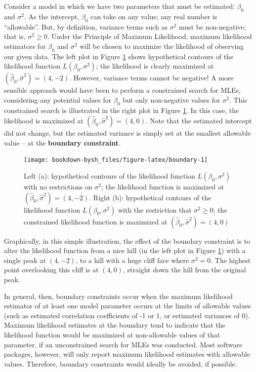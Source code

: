\documentclass[
]{krantz}
\begin{document}
Consider a model in which we have two parameters that must be estimated: \(\beta_0\) and \(\sigma^2\). As the intercept, \(\beta_0\) can take on any value; any real number is ``allowable''. But, by definition, variance terms such as \(\sigma^2\) must be non-negative; that is, \(\sigma^2 \geq 0\). Under the Principle of Maximum Likelihood, maximum likelihood estimators for \(\beta_0\) and \(\sigma^2\) will be chosen to maximize the likelihood of observing our given data. The left plot in Figure \ref{fig:boundary} shows hypothetical contours of the likelihood function \(L(\beta_0, \sigma^2)\); the likelihood is clearly maximized at \((\hat{\beta}_0 , \hat{\sigma}^2)=(4,-2)\). However, variance terms cannot be negative! A more sensible approach would have been to perform a constrained search for MLEs, considering any potential values for \(\beta_0\) but only non-negative values for \(\sigma^2\). This constrained search is illustrated in the right plot in Figure \ref{fig:boundary}. In this case, the likelihood is maximized at \((\hat{\beta}_0 , \hat{\sigma}^2)=(4,0)\). Note that the estimated intercept did not change, but the estimated variance is simply set at the smallest allowable value -- at the \textbf{boundary constraint}.



\begin{figure}

{\centering \texttt{[image: bookdown-bysh\_files/figure-latex/boundary-1]} 

}

\caption{Left (a): hypothetical contours of the likelihood function \(L(\beta_0, \sigma^2)\) with no restrictions on \(\sigma^2\); the likelihood function is maximized at \((\hat{\beta}_0, \hat{\sigma}^2)=(4,-2)\). Right (b): hypothetical contours of the likelihood function \(L(\beta_0, \sigma^2)\) with the restriction that \(\sigma^2 \geq 0\); the constrained likelihood function is maximized at \((\hat{\beta}_0, \hat{\sigma}^2)=(4,0)\)}\label{fig:boundary}
\end{figure}

Graphically, in this simple illustration, the effect of the boundary constraint is to alter the likelihood function from a nice hill (in the left plot in Figure \ref{fig:boundary}) with a single peak at \((4,-2)\), to a hill with a huge cliff face where \(\sigma^2=0\). The highest point overlooking this cliff is at \((4,0)\), straight down the hill from the original peak.

In general, then, boundary constraints occur when the maximum likelihood estimator of at least one model parameter occurs at the limits of allowable values (such as estimated correlation coefficients of -1 or 1, or estimated variances of 0). Maximum likelihood estimates at the boundary tend to indicate that the likelihood function would be maximized at non-allowable values of that parameter, if an unconstrained search for MLEs was conducted. Most software packages, however, will only report maximum likelihood estimates with allowable values. Therefore, boundary constraints would ideally be avoided, if possible.
\end{document}
